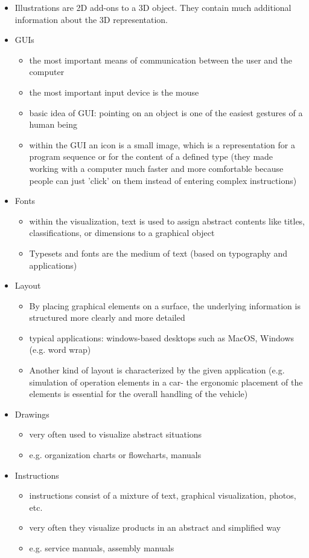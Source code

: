 \documentclass{standalone}
\begin{document}
\begin{itemize}
	\item Illustrations are 2D add-ons to a 3D object. They contain much additional information about the 3D representation.
	\item GUIs
		\begin{itemize}
			\item the most important means of communication between the user and the computer
			\item the most important input device is the mouse
			\item basic idea of GUI: pointing on an object is one of the easiest gestures of a human being
			\item within the GUI an icon is a small image, which is a representation for a program sequence or for the content of a defined type (they made working with a computer much faster and more comfortable because people can just 'click' on them instead of entering complex instructions)
		\end{itemize}
	\item Fonts
		\begin{itemize}
			\item within the visualization, text is used to assign abstract contents like titles, classifications, or dimensions to a graphical object
			\item Typesets and fonts are the medium of text (based on typography and applications)
		\end{itemize}
	\item Layout
		\begin{itemize}
			\item By placing graphical elements on a surface, the underlying information is structured more clearly and more detailed
			\item typical applications: windows-based desktops such as MacOS, Windows (e.g. word wrap)
			\item Another kind of layout is characterized by the given application (e.g. simulation of operation elements in a car- the ergonomic placement of the elements is essential for the overall handling of the vehicle)
		\end{itemize}
	\item Drawings
		\begin{itemize}
			\item very often used to visualize abstract situations
			\item e.g. organization charts or flowcharts, manuals
		\end{itemize}
	\item Instructions
		\begin{itemize}
			\item instructions consist of a mixture of text, graphical visualization, photos, etc.
			\item very often they visualize products in an abstract and simplified way
			\item e.g. service manuals, assembly manuals
		\end{itemize}
\end{itemize}
\end{document}
